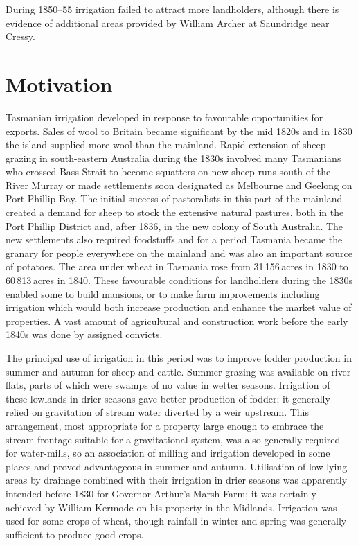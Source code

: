 During 1850--55 irrigation failed to attract more landholders,
although there is evidence of additional areas provided by William
Archer at Saundridge near
Cressy.

\section*{Motivation}

Tasmanian irrigation developed in response to favourable opportunities
for exports.  Sales of wool to Britain became significant
by the mid 1820s and in 1830 the island supplied more wool than the
mainland.  Rapid extension of sheep-grazing in south-eastern Australia
during the 1830s involved many Tasmanians who crossed Bass Strait to
become squatters on new sheep runs south of the River
Murray or made settlements soon designated as
Melbourne and Geelong on Port Phillip
Bay. The initial success of pastoralists in
this part of the mainland created a demand for sheep to stock the
extensive natural pastures, both in the Port Phillip District and,
after 1836, in the new colony of South Australia. The new settlements also required foodstuffs and for a
period Tasmania became the granary for people everywhere on the
mainland and was also an important source of potatoes.  The area under
wheat in Tasmania rose from 31\,156\,acres in 1830 to 60\,813\,acres in
1840.  These favourable conditions for landholders during the 1830s
enabled some to build mansions, or to make farm improvements including
irrigation which would both increase production and enhance the market
value of properties.  A vast amount of agricultural and construction
work before the early 1840s was done by assigned
convicts.

The principal use of irrigation in this period was to improve fodder
production in summer and autumn for sheep and cattle. Summer grazing
was available on river flats, parts of which were swamps of no value
in wetter seasons.  Irrigation of these lowlands in drier seasons gave
better production of fodder; it generally relied on gravitation of
stream water diverted by a weir upstream.  This arrangement, most
appropriate for a property large enough to embrace the stream frontage
suitable for a gravitational system, was also generally required for
water-mills, so an association of milling and irrigation developed in
some places and proved advantageous in summer and autumn.  Utilisation
of low-lying areas by drainage combined with their irrigation in drier
seasons was apparently intended before 1830 for Governor Arthur's
Marsh Farm; it was certainly achieved by William Kermode on his
property in the Midlands.  Irrigation was used for some crops of
wheat, though rainfall in winter and spring was generally sufficient
to produce good crops.

